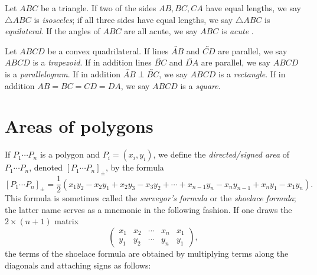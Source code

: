 \documentclass[12pt]{book}
\numberwithin{exc}{section}
\numberwithin{figure}{section}
\numberwithin{equation}{theorem}
\def\line#1{\overleftrightarrow{#1}}
\begin{document}
Let $ABC$ be a triangle. If two of the sides $AB,BC,CA$ have equal lengths, we
say $\triangle ABC$ is \emph{isosceles}; if all three sides have equal lengths, we say $\triangle ABC$ is \emph{equilateral}. If the angles of
$ABC$ are all acute, we say $ABC$ is \emph{acute} 
.

Let $ABCD$ be a convex quadrilateral. If lines $\line{AB}$ and $\line{CD}$
are parallel, we say $ABCD$ is a \emph{trapezoid}.  
If in addition lines $\line{BC}$ and $\line{DA}$ are parallel, we say
$ABCD$ is a \emph{parallelogram}. 
If in addition $\line{AB} \perp \line{BC}$, we say $ABCD$ is a \emph{rectangle}.
If in addition $AB=BC=CD=DA$, we say $ABCD$ is a \emph{square}.

\section{Areas of polygons}

If $P_1\cdots P_n$ is a polygon and $P_i = (x_i, y_i)$, we define the
\emph{directed/signed area}
of $P_1\cdots P_n$, denoted $[P_1\cdots P_n]_{\pm}$, by the formula
\[
[P_1\cdots P_n]_{\pm} = \frac{1}{2} (x_1y_2 - x_2y_1 + x_2y_3 - x_3y_2 + \cdots
+ x_{n-1}y_n - x_n y_{n-1} + x_n y_1 - x_1 y_n).
\]
This formula is sometimes called the \emph{surveyor's formula}
or the \emph{shoelace formula};
the latter name serves as a mnemonic in the following fashion.
If one draws the $2 \times (n+1)$ matrix
\[
\begin{pmatrix} x_1 & x_2 & \cdots & x_n & x_1 \\
y_1 & y_2 & \cdots & y_n & y_1
\end{pmatrix},
\]
the terms of the shoelace formula are obtained by 
multiplying terms along the diagonals and attaching signs as follows:
\end{document}
